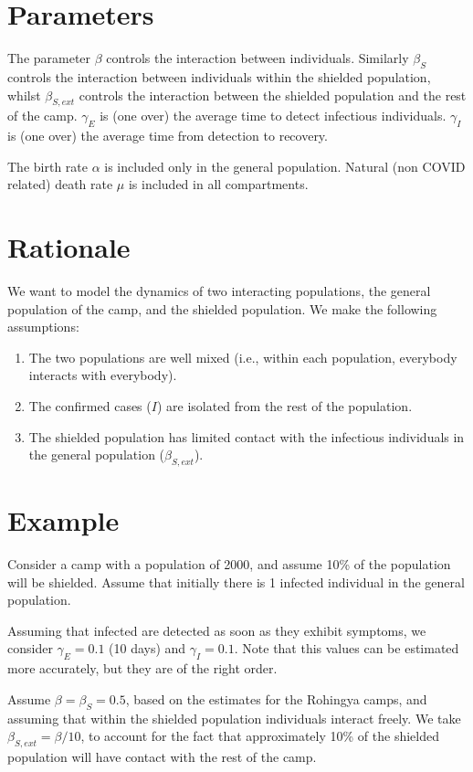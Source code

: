 \documentclass{article}
\begin{document}
\section{Parameters}

The parameter $\beta$ controls the interaction between individuals. Similarly
$\beta_S$ controls the interaction between individuals within the shielded
population, whilst $\beta_{S,ext}$ controls the interaction between the
shielded population and the rest of the camp. $\gamma_E$ is (one over) the
average time to detect infectious individuals. $\gamma_I$ is (one over) the
average time from detection to recovery.

The birth rate $\alpha$ is included only in the general population. Natural
(non COVID related) death rate $\mu$ is included in all compartments.


\section{Rationale}

We want to model the dynamics of two interacting populations, the general
population of the camp, and the shielded population. We make the following
assumptions:

\begin{enumerate}
\item The two populations are well mixed (i.e., within each population,
everybody interacts with everybody).
\item The confirmed cases ($I$) are isolated from the rest of the population.
\item The shielded population has limited contact with the infectious
individuals in the general population ($\beta_{S,ext}$). 
\end{enumerate}

\section{Example}

Consider a camp with a population of 2000, and assume 10\% of the population
will be shielded. Assume that initially there is 1 infected individual in the
general population. 

Assuming that infected are detected as soon as they exhibit symptoms, we
consider $\gamma_E = 0.1$ (10 days) and $\gamma_I = 0.1$. Note that this values
can be estimated more accurately, but they are of the right order. 

Assume $\beta = \beta_S = 0.5$, based on the estimates for the Rohingya camps,
and assuming that within the shielded population individuals interact freely.
We take $\beta_{S,ext} = \beta/10$, to account for the fact that approximately
10\% of the shielded population will have contact with the rest of the camp.
\end{document}

